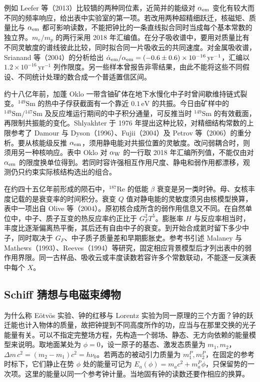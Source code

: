 例如 Leefer 等（2013）比较镝的两种同位素，近简并的能级对 $\alpha_{\rm em}$ 变化有较大而不同的频率响应，给出表中实验室的第一项。若改用两种超精细跃迁，核磁矩、质量比与 $\alpha_{\rm em}$ 都可影响读数，不能把钟比的一条直线拟合同时当成每个基本常数的独立界。$m_e/m_p$ 的两行采用 2018 年汇编值。在分子吸收谱中，要用对质量比有不同灵敏度的谱线彼此比较，同时拟合同一片吸收云的共同速度。对金属吸收谱，Srianand 等（2004）的分析给出 $\dot\alpha_{\rm em}/\alpha_{\rm em}=(-0.6\pm0.6)\times10^{-16}\,\mathrm{yr}^{-1}$，汇编以 $1.2\times10^{-16}\,\mathrm{yr}^{-1}$ 列作限度。另一些样本曾报告非零结果，由此不能将这些不同假设、不同统计处理的数合成一个普适置信区间。

约十八亿年前，加蓬 Oklo 一带含铀矿体在地下水慢化中子时曾间歇维持链式裂变。$^{149}\mathrm{Sm}$ 的热中子俘获截面有一个靠近 $0.1\,\mathrm{eV}$ 的共振。今日由矿样中的 $^{149}\mathrm{Sm}/{}^{147}\mathrm{Sm}$ 及反应堆运行期间的中子积分通量，可反推当时 $^{149}\mathrm{Sm}$ 的有效截面，再限制共振能的变化。Shlyakhter 于 1976 年提出这种比较，对精细结构常数的上限参考了 Damour 与 Dyson（1996）、Fujii（2004）及 Petrov 等（2006）的重分析。要从核能级反推 $\alpha_{\rm em}$，须用静电能对共振位置的灵敏度。改问弱耦合时，则须用另一种核响应。表中 Oklo 对 $\alpha_{\rm W}$ 的一行取 2018 年汇编所列值，不能仅由对 $\alpha_{\rm em}$ 的限度换单位得到。若同时容许强相互作用尺度、静电和弱作用都漂移，观测仍只约束实际核结构选出的组合。

在约四十五亿年前形成的陨石中，$^{187}\mathrm{Re}$ 的低能 $\beta$ 衰变是另一类时钟。母、女核丰度记载的是衰变率的时间积分。衰变 $Q$ 值对静电能的灵敏度须另由核模型换算，表中一项出自 Olive 等（2004）。原初核合成所含的弱作用信息又不同。在自然单位中，中子、质子互变的热反应率约正比于 $G_F^2 T^5$。膨胀率 $H$ 与反应率相当时，丰度比逐渐偏离热平衡，其后还有自由中子的衰变。到开始合成氦时留下多少中子，同时取决于 $G_F$、中子质子质量差和早期膨胀史。参考书引述 Malaney 与 Mathews（1993）、Reeves（1994）等研究，固定相应背景模型后才列出表中的弱作用界限。同一古样品、吸收云或丰度读数若容许多个常数联动，不能逐一反演表中每个 $X$。

\subsection{Schiff 猜想与电磁束缚物}

为什么称 Eötvös 实验、钟的红移与 Lorentz 实验为同一原理的三个方面？钟的跃迁能也计入物体的质量，故把钟提到不同高度所作的功，应当与在那里交换的光子能量有关。可以不指定完整场方程，先构造一个弱场、静态、无方向依赖的能量模型来说明。取地面某处为 $\phi=0$，设一原子的基态、激发态质量为 $m_1,m_2$，$\Delta m\,c^2=(m_2-m_1)c^2=h\nu_0$。若两态的被动引力质量为 $m_1^P,m_2^P$，在固定的参考时标下，它们静止在势 $\phi$ 处的能量可记为 $E_a(\phi)=m_ac^2+m_a^P\phi$，只保留势的一次项。这里的能量以同一个参考钟计量。当地固有钟的读数还要作相应的换算。

